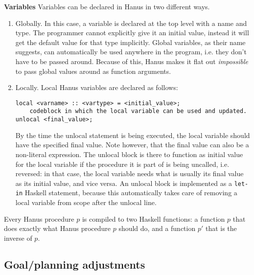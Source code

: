 \documentclass[12pt,a4paper]{article}
\newcommand{\inlinecode}[1]{\texttt{#1}}
\begin{document}
			\leavevmode\newline\textbf{Variables}\newline
			Variables can be declared in Hanus in two different ways.
			\begin{enumerate}
				\item
					Globally. In this case, a variable is declared at the top level with a name and type. The programmer cannot explicitly give it an initial value, instead it will get the default value for that type implicitly. Global variables, as their name suggests, can automatically be used anywhere in the program, i.e. they don't have to be passed around. Because of this, Hanus makes it flat out \emph{impossible} to pass global values around as function arguments.
				\item
					Locally. Local Hanus variables are declared as follows:
					\begin{verbatim}
local <varname> :: <vartype> = <initial_value>;
	codeblock in which the local variable can be used and updated.
unlocal <final_value>;
					\end{verbatim}
					By the time the unlocal statement is being executed, the local variable should have the specified final value. Note however, that the final value can also be a non-literal expression. The unlocal block is there to function as initial value for the local variable if the procedure it is part of is being uncalled, i.e. reversed: in that case, the local variable needs what is usually its final value as its initial value, and vice versa. An unlocal block is implemented as a \inlinecode{let-in} Haskell statement, because this automatically takes care of removing a local variable from scope after the unlocal line.
					
			\end{enumerate}
				
			
			
			 Every Hanus procedure $p$ is compiled to two Haskell functions: a function $p$ that does exactly what Hanus procedure $p$ should do, and a function $p'$ that is the inverse of $p$.
	
	\subsection{Goal/planning adjustments}
\end{document}
